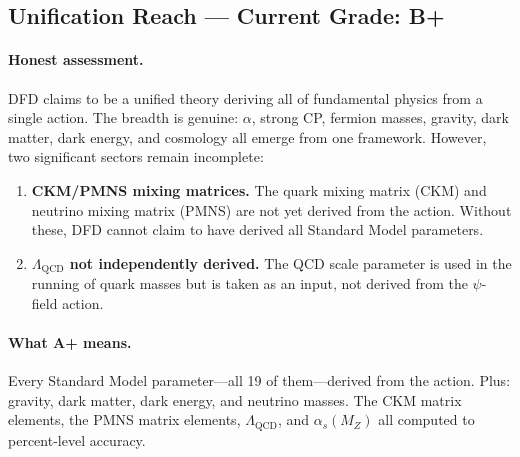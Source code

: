 \documentclass[11pt,a4paper]{article}
\begin{document}
\subsection{Unification Reach --- Current Grade: B+}

\paragraph{Honest assessment.}
DFD claims to be a unified theory deriving all of fundamental physics from a single action. The breadth is genuine: $\alpha$, strong CP, fermion masses, gravity, dark matter, dark energy, and cosmology all emerge from one framework. However, two significant sectors remain incomplete:
\begin{enumerate}[label=(\alph*)]
    \item \textbf{CKM/PMNS mixing matrices.} The quark mixing matrix (CKM) and neutrino mixing matrix (PMNS) are not yet derived from the action. Without these, DFD cannot claim to have derived all Standard Model parameters.
    \item \textbf{$\Lambda_{\text{QCD}}$ not independently derived.} The QCD scale parameter is used in the running of quark masses but is taken as an input, not derived from the $\psi$-field action.
\end{enumerate}

\paragraph{What A+ means.}
Every Standard Model parameter---all 19 of them---derived from the action. Plus: gravity, dark matter, dark energy, and neutrino masses. The CKM matrix elements, the PMNS matrix elements, $\Lambda_{\text{QCD}}$, and $\alpha_s(M_Z)$ all computed to percent-level accuracy.
\end{document}
